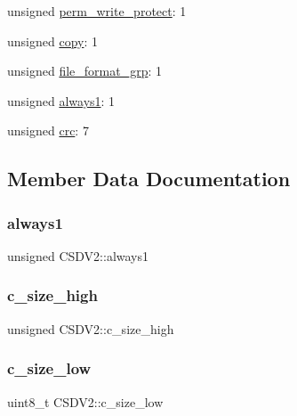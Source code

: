 \begin{DoxyCompactItemize}
\item 
unsigned \hyperlink{struct_c_s_d_v2_ae8a4cd07025c0192acc093cca8379d73}{perm\+\_\+write\+\_\+protect}\+: 1
\item 
unsigned \hyperlink{struct_c_s_d_v2_a94c3a6332d4905be59800fd59aafe5ff}{copy}\+: 1
\item 
unsigned \hyperlink{struct_c_s_d_v2_a093e6982187fdc5ba9c787c014f6296c}{file\+\_\+format\+\_\+grp}\+: 1
\item 
unsigned \hyperlink{struct_c_s_d_v2_a3bcdd97582c0d282b5e4270def81f156}{always1}\+: 1
\item 
unsigned \hyperlink{struct_c_s_d_v2_a099f7c6b9acbfa6b733fe4ab94c10ccc}{crc}\+: 7
\end{DoxyCompactItemize}


\subsection{Member Data Documentation}
\mbox{\label{struct_c_s_d_v2_a3bcdd97582c0d282b5e4270def81f156}} 
\subsubsection{\texorpdfstring{always1}{always1}}
{\footnotesize\ttfamily unsigned C\+S\+D\+V2\+::always1}

\mbox{\label{struct_c_s_d_v2_a3bfb96cd3f44af64691bc12fbdaf6bbd}} 
\subsubsection{\texorpdfstring{c\+\_\+size\+\_\+high}{c\_size\_high}}
{\footnotesize\ttfamily unsigned C\+S\+D\+V2\+::c\+\_\+size\+\_\+high}

\mbox{\label{struct_c_s_d_v2_aa3717fe7ec52d0336e3729144c15ca3d}} 
\subsubsection{\texorpdfstring{c\+\_\+size\+\_\+low}{c\_size\_low}}
{\footnotesize\ttfamily uint8\+\_\+t C\+S\+D\+V2\+::c\+\_\+size\+\_\+low}

